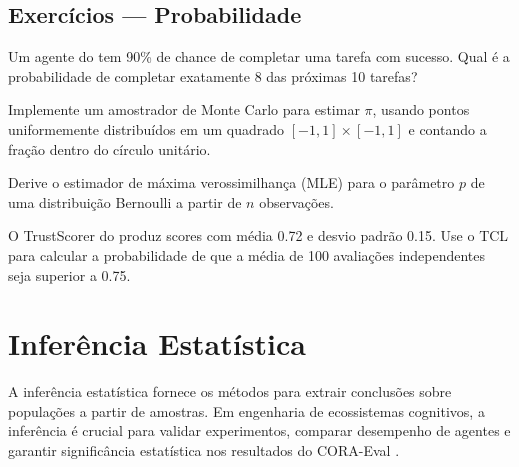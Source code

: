 \subsection{Exercícios — Probabilidade}
\begin{exercicio}
Um agente do \opencodeeco{} tem 90\% de chance de completar uma tarefa
com sucesso. Qual é a probabilidade de completar exatamente 8 das
próximas 10 tarefas?
\end{exercicio}
\begin{exercicio}
Implemente um amostrador de Monte Carlo para estimar $\pi$, usando
pontos uniformemente distribuídos em um quadrado $[-1,1] \times [-1,1]$
e contando a fração dentro do círculo unitário.
\end{exercicio}
\begin{exercicio}
Derive o estimador de máxima verossimilhança (MLE) para o parâmetro $p$
de uma distribuição Bernoulli a partir de $n$ observações.
\end{exercicio}
\begin{exercicio}
O TrustScorer do \opencodeeco{} produz scores com média 0.72 e desvio
padrão 0.15. Use o TCL para calcular a probabilidade de que a média de
100 avaliações independentes seja superior a 0.75.
\end{exercicio}
\section{Inferência Estatística}
\label{sec:inferencia-estatistica}
\nivelavancado
A inferência estatística fornece os métodos para extrair conclusões sobre
populações a partir de amostras. Em engenharia de ecossistemas cognitivos,
a inferência é crucial para validar experimentos, comparar desempenho de
agentes e garantir significância estatística nos resultados do CORA-Eval
\cite{wasserman2004all, hastie2009elements, box1976science}.
